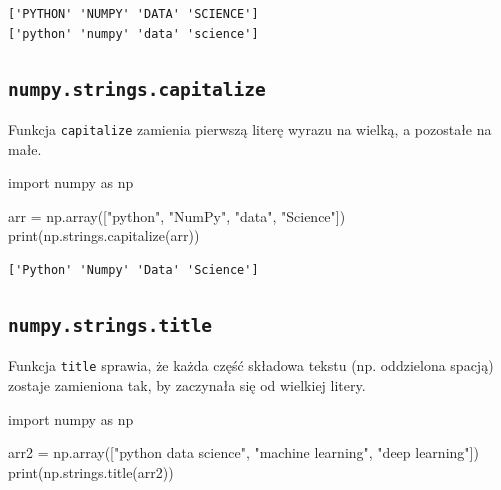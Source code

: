 \documentclass[
  letterpaper,
  DIV=11,
  numbers=noendperiod]{scrreprt}
\newenvironment{Shaded}{\begin{snugshade}}{\end{snugshade}}
\newcommand{\BuiltInTok}[1]{\textcolor[rgb]{0.00,0.23,0.31}{#1}}
\newcommand{\ImportTok}[1]{\textcolor[rgb]{0.00,0.46,0.62}{#1}}
\newcommand{\NormalTok}[1]{\textcolor[rgb]{0.00,0.23,0.31}{#1}}
\newcommand{\OperatorTok}[1]{\textcolor[rgb]{0.37,0.37,0.37}{#1}}
\newcommand{\StringTok}[1]{\textcolor[rgb]{0.13,0.47,0.30}{#1}}
\begin{document}
\begin{verbatim}
['PYTHON' 'NUMPY' 'DATA' 'SCIENCE']
['python' 'numpy' 'data' 'science']
\end{verbatim}

\subsection{\texorpdfstring{\texttt{numpy.strings.capitalize}}{numpy.strings.capitalize}}\label{numpy.strings.capitalize}

Funkcja \texttt{capitalize} zamienia pierwszą literę wyrazu na wielką, a
pozostałe na małe.

\begin{Shaded}
\begin{Highlighting}[]
\ImportTok{import}\NormalTok{ numpy }\ImportTok{as}\NormalTok{ np}

\NormalTok{arr }\OperatorTok{=}\NormalTok{ np.array([}\StringTok{"python"}\NormalTok{, }\StringTok{"NumPy"}\NormalTok{, }\StringTok{"data"}\NormalTok{, }\StringTok{"Science"}\NormalTok{])}
\BuiltInTok{print}\NormalTok{(np.strings.capitalize(arr))}
\end{Highlighting}
\end{Shaded}

\begin{verbatim}
['Python' 'Numpy' 'Data' 'Science']
\end{verbatim}

\subsection{\texorpdfstring{\texttt{numpy.strings.title}}{numpy.strings.title}}\label{numpy.strings.title}

Funkcja \texttt{title} sprawia, że każda część składowa tekstu (np.
oddzielona spacją) zostaje zamieniona tak, by zaczynała się od wielkiej
litery.

\begin{Shaded}
\begin{Highlighting}[]
\ImportTok{import}\NormalTok{ numpy }\ImportTok{as}\NormalTok{ np}

\NormalTok{arr2 }\OperatorTok{=}\NormalTok{ np.array([}\StringTok{"python data science"}\NormalTok{, }\StringTok{"machine learning"}\NormalTok{, }\StringTok{"deep learning"}\NormalTok{])}
\BuiltInTok{print}\NormalTok{(np.strings.title(arr2))}
\end{Highlighting}
\end{Shaded}
\end{document}
